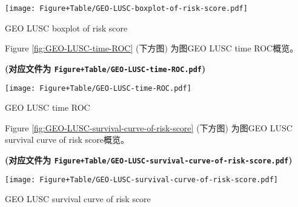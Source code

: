 \documentclass[
]{article}
\begin{document}
\def\@captype{figure}
\begin{center}
\texttt{[image: Figure+Table/GEO-LUSC-boxplot-of-risk-score.pdf]}
\caption{GEO LUSC boxplot of risk score}\label{fig:GEO-LUSC-boxplot-of-risk-score}
\end{center}

\begin{center}\vspace{1.5cm}\end{center}

\begin{center}\vspace{1.5cm}\end{center}

Figure \ref{fig:GEO-LUSC-time-ROC} (下方图) 为图GEO LUSC time ROC概览。

\textbf{(对应文件为 \texttt{Figure+Table/GEO-LUSC-time-ROC.pdf})}

\def\@captype{figure}
\begin{center}
\texttt{[image: Figure+Table/GEO-LUSC-time-ROC.pdf]}
\caption{GEO LUSC time ROC}\label{fig:GEO-LUSC-time-ROC}
\end{center}

\begin{center}\vspace{1.5cm}\end{center}

\begin{center}\vspace{1.5cm}\end{center}

Figure \ref{fig:GEO-LUSC-survival-curve-of-risk-score} (下方图) 为图GEO LUSC survival curve of risk score概览。

\textbf{(对应文件为 \texttt{Figure+Table/GEO-LUSC-survival-curve-of-risk-score.pdf})}

\def\@captype{figure}
\begin{center}
\texttt{[image: Figure+Table/GEO-LUSC-survival-curve-of-risk-score.pdf]}
\caption{GEO LUSC survival curve of risk score}\label{fig:GEO-LUSC-survival-curve-of-risk-score}
\end{center}

\begin{center}\vspace{1.5cm}\end{center}
\end{document}

